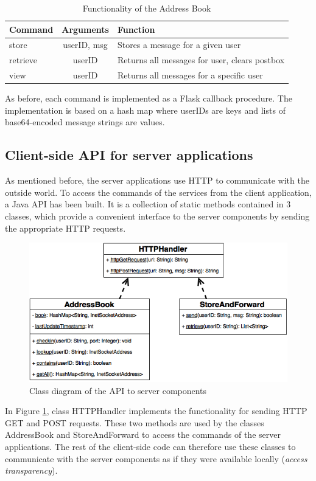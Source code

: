\documentclass[a4paper, 12pt]{report}
\begin{document}
\begin{table}[H]
\centering
\begin{tabular*}{0.9\textwidth}{l | c | l}
    Command & Arguments & Function \\
    \hline
    store & userID, msg & Stores a message for a given user \\
    retrieve & userID & Returns all messages for user, clears postbox\\
    view & userID & Returns all messages for a specific user \\
\end{tabular*}
\caption{\label{tab:saf} Functionality of the Address Book}
\end{table}

As before, each command is implemented as a Flask callback procedure. The implementation is based on a hash map where userIDs are keys and lists of base64-encoded message strings are values.


\subsection{Client-side API for server applications}
\label{subsec:impl.prep.API}
As mentioned before, the server applications use HTTP to communicate with the outside world. To access the commands of the services from the client application, a Java API has been built. It is a collection of static methods contained in 3 classes, which provide a convenient interface to the server components by sending the appropriate HTTP requests.

\begin{figure}[H]
    \centering
    \includegraphics[width = 0.8 \linewidth]{pics/scaffolding_uml.png}
    \caption{\label{fig:scaffolding_uml} Class diagram of the API to server components}
\end{figure}
In Figure \ref{fig:scaffolding_uml}, class HTTPHandler implements the functionality for sending HTTP GET and POST requests. These two methods are used by the classes AddressBook and StoreAndForward to access the commands of the server applications. The rest of the client-side code can therefore use these classes to communicate with the server components as if they were available locally (\emph{access transparency}). \\
\end{document}
